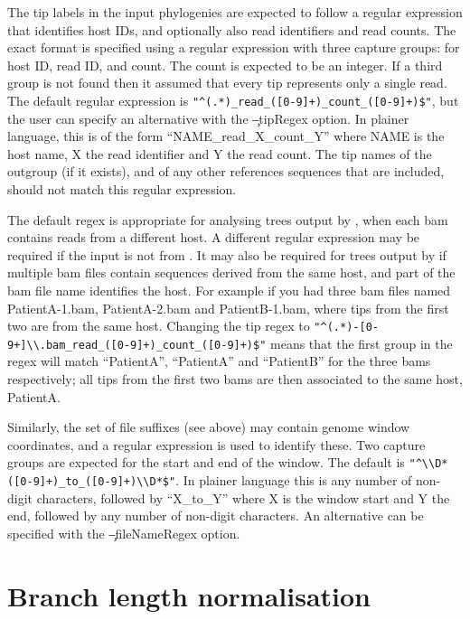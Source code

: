 The tip labels in the input phylogenies are expected to follow a regular expression that identifies host IDs, and optionally also read identifiers and read counts.
The exact format is specified using a regular expression with three capture groups: for host ID, read ID, and count.
The count is expected to be an integer.
If a third group is not found then it assumed that every tip represents only a single read.
The default regular expression is \verb|"^(.*)_read_([0-9]+)_count_([0-9]+)$"|, but the user can specify an alternative with the \c{--tipRegex} option.
In plainer language, this is of the form ``NAME\_read\_X\_count\_Y'' where NAME is the host name, X the read identifier and Y the read count.
The tip names of the outgroup (if it exists), and of any other references sequences that are included, should not match this regular expression.

The default regex is appropriate for analysing trees output by \pmt, when each bam contains reads from a different host.
A different regular expression may be required if the input is not from \pmt.
It may also be required for trees output by \pmt if multiple bam files contain sequences derived from the same host, and part of the bam file name identifies the host.
For example if you had three bam files named \mbox{PatientA-1.bam}, PatientA-2.bam and PatientB-1.bam, where tips from the first two are from the same host.
Changing the tip regex to \verb|"^(.*)-[0-9+]\\.bam_read_([0-9]+)_count_([0-9]+)$"| means that the first group in the regex will match ``PatientA'', ``PatientA'' and ``PatientB'' for the three bams respectively; all tips from the first two bams are then associated to the same host, PatientA.

Similarly, the set of file suffixes (see above) may contain genome window coordinates, and a regular expression is used to identify these.
Two capture groups are expected for the start and end of the window.
The default is \verb|"^\\D*([0-9]+)_to_([0-9]+)\\D*$"|.
In plainer language this is any number of non-digit characters, followed by ``X\_to\_Y'' where X is the window start and Y the end, followed by any number of non-digit characters.
An alternative can be specified with the \c{--fileNameRegex} option.

\section{Branch length normalisation} \label{sec:normalisation}

